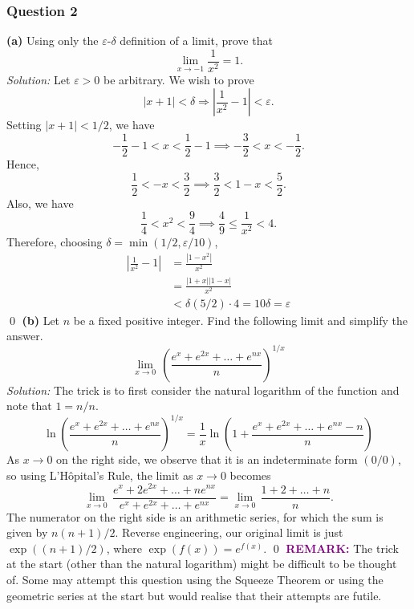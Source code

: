 \documentclass{article}
\begin{document}
\subsubsection*{Question 2}
\textbf{(a)} Using only the $\varepsilon$-$\delta$ definition of a limit, prove that \[\lim_{x\rightarrow -1}{\frac{1}{x^2}}=1.\]
\textit{Solution:} Let $\varepsilon>0$ be arbitrary. We wish to prove \[\left| x+1 \right|<\delta \Rightarrow \left| \frac{1}{{{x}^{2}}}-1 \right|<\varepsilon.\] Setting $|x+1|<1/2$, we have \[-\frac{1}{2}-1<x<\frac{1}{2}-1 \implies -\frac{3}{2}<x<-\frac{1}{2}.\] Hence, \[\frac{1}{2}<-x<\frac{3}{2} \implies \frac{3}{2}<1-x<\frac{5}{2}.\] Also, we have \[\frac{1}{4}<x^2<\frac{9}{4} \implies \frac{4}{9} \le \frac{1}{x^2}<4.\] Therefore, choosing $\delta=\operatorname{min}(1/2,\varepsilon/10)$, \begin{align*}
    \left|\frac{1}{x^2}-1\right|&=\frac{|1-x^2|}{x^2}\\
    &=\frac{|1+x||1-x|}{x^2}\\
    &<\delta(5/2)\cdot 4=10\delta=\varepsilon
\end{align*} \qed
\newline
\newline
\textbf{(b)} Let $n$ be a fixed positive integer. Find the following limit and simplify the answer. \[\underset{x\to 0}{\mathop{\lim }}\,{{\left( \frac{{{e}^{x}}+{{e}^{2x}}+\ldots +{{e}^{nx}}}{n} \right)}^{1/x}}\]
\textit{Solution:} The trick is to first consider the natural logarithm of the function and note that $1=n/n$. 
\[\ln {{\left( \frac{{{e}^{x}}+{{e}^{2x}}+\ldots +{{e}^{nx}}}{n} \right)}^{1/x}}=\frac{1}{x}\ln \left( 1+\frac{{{e}^{x}}+{{e}^{2x}}+\ldots +{{e}^{nx}}-n}{n} \right)\]
As $x\rightarrow 0$ on the right side, we observe that it is an indeterminate form $(0/0)$, so using L'Hôpital's Rule, the limit as $x\rightarrow 0$ becomes \[\underset{x\to 0}{\mathop{\lim }}\,\frac{{{e}^{x}}+2{{e}^{2x}}+\ldots +n{{e}^{nx}}}{{{e}^{x}}+{{e}^{2x}}+\ldots +{{e}^{nx}}}=\underset{x\to 0}{\mathop{\lim }}\,\frac{1+2+\ldots +n}{n}.\] The numerator on the right side is an arithmetic series, for which the sum is given by $n(n+1)/2$. Reverse engineering, our original limit is just $\operatorname{exp}\left((n+1)/2\right)$, where $\operatorname{exp}(f(x))=e^{f(x)}$. \qed 
\newline
\newline\textbf{\textcolor{purple}{REMARK:}} The trick at the start (other than the natural logarithm) might be difficult to be thought of. Some may attempt this question using the Squeeze Theorem or using the geometric series at the start but would realise that their attempts are futile.
\newpage
\end{document}
